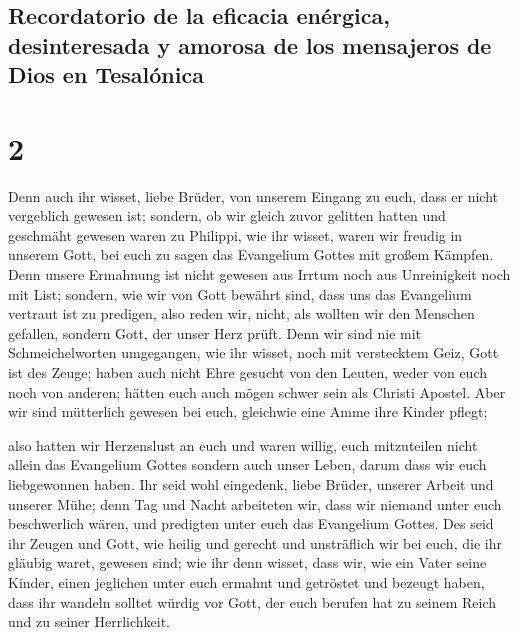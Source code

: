 \hypertarget{recordatorio-de-la-eficacia-enuxe9rgica-desinteresada-y-amorosa-de-los-mensajeros-de-dios-en-tesaluxf3nica}{%
\subsection{Recordatorio de la eficacia enérgica, desinteresada y
amorosa de los mensajeros de Dios en
Tesalónica}\label{recordatorio-de-la-eficacia-enuxe9rgica-desinteresada-y-amorosa-de-los-mensajeros-de-dios-en-tesaluxf3nica}}

\hypertarget{section-1}{%
\section{2}\label{section-1}}

 Denn auch ihr wisset, liebe Brüder, von unserem Eingang
zu euch, dass er nicht vergeblich gewesen ist;  sondern,
ob wir gleich zuvor gelitten hatten und geschmäht gewesen waren zu
Philippi, wie ihr wisset, waren wir freudig in unserem Gott, bei euch zu
sagen das Evangelium Gottes mit großem Kämpfen.  Denn
unsere Ermahnung ist nicht gewesen aus Irrtum noch aus Unreinigkeit noch
mit List;  sondern, wie wir von Gott bewährt sind, dass
uns das Evangelium vertraut ist zu predigen, also reden wir, nicht, als
wollten wir den Menschen gefallen, sondern Gott, der unser Herz prüft.
 Denn wir sind nie mit Schmeichelworten umgegangen, wie
ihr wisset, noch mit verstecktem Geiz, Gott ist des Zeuge;
 haben auch nicht Ehre gesucht von den Leuten, weder von
euch noch von anderen;  hätten euch auch mögen schwer sein
als Christi Apostel. Aber wir sind mütterlich gewesen bei euch,
gleichwie eine Amme ihre Kinder pflegt;

 also hatten wir Herzenslust an euch und waren willig,
euch mitzuteilen nicht allein das Evangelium Gottes sondern auch unser
Leben, darum dass wir euch liebgewonnen haben.  Ihr seid
wohl eingedenk, liebe Brüder, unserer Arbeit und unserer Mühe; denn Tag
und Nacht arbeiteten wir, dass wir niemand unter euch beschwerlich
wären, und predigten unter euch das Evangelium Gottes. 
Des seid ihr Zeugen und Gott, wie heilig und gerecht und unsträflich wir
bei euch, die ihr gläubig waret, gewesen sind;  wie ihr
denn wisset, dass wir, wie ein Vater seine Kinder, einen jeglichen unter
euch ermahnt und getröstet  und bezeugt haben, dass ihr
wandeln solltet würdig vor Gott, der euch berufen hat zu seinem Reich
und zu seiner Herrlichkeit.

